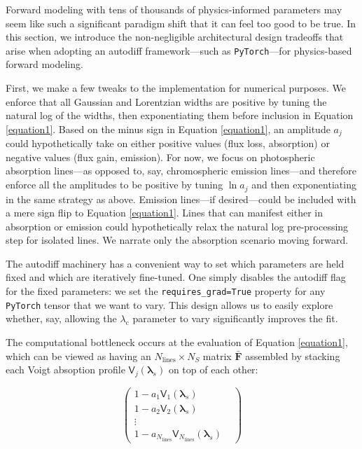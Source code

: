 \documentclass[twocolumn]{aastex631}
\begin{document}
Forward modeling with tens of thousands of physics-informed parameters may seem like such a significant paradigm shift that it can feel too good to be true.  In this section, we introduce the non-negligible architectural design tradeoffs that arise when adopting an autodiff framework---such as \texttt{PyTorch}---for physics-based forward modeling.

First, we make a few tweaks to the implementation for numerical purposes. We enforce that all Gaussian and Lorentzian widths are positive by tuning the natural log of the widths, then exponentiating them before inclusion in Equation \ref{equation1}. Based on the minus sign in Equation \ref{equation1}, an amplitude $a_j$ could hypothetically take on either positive values (flux loss, absorption) or negative values (flux gain, emission).  For now, we focus on photospheric absorption lines---as opposed to, say, chromospheric emission lines---and therefore enforce all the amplitudes to be positive by tuning $\ln{a_j}$ and then exponentiating in the same strategy as above.  Emission lines---if desired---could be included with a mere sign flip to Equation \ref{equation1}.  Lines that can manifest either in absorption or emission could hypothetically relax the natural log pre-processing step for isolated lines.  We narrate only the absorption scenario moving forward.

The autodiff machinery has a convenient way to set which parameters are held fixed and which are iteratively fine-tuned.  One simply disables the autodiff flag for the fixed parameters: we set the \texttt{requires\_grad=True} property for any \texttt{PyTorch} tensor that we want to vary. This design allows us to easily explore whether, say, allowing the $\lambda_\mathrm{c}$ parameter to vary significantly improves the fit.

The computational bottleneck occurs at the evaluation of Equation \ref{equation1}, which can be viewed as having an $N_{\mathrm{lines}}\times N_{S}$ matrix $\bm{\bar{F}}$ assembled by stacking each Voigt absoption profile $\mathsf{V}_j(\bm{\lambda}_s)$ on top of each other:

\begin{equation}
    \begin{pmatrix}
        1 - a_1 \mathsf{V}_1(\bm{\lambda}_s)                                       & \\
        1 - a_2 \mathsf{V}_2(\bm{\lambda}_s)                                       & \\
        \vdots                                                                     & \\
        1 - a_{N_{\mathrm{lines}}} \mathsf{V}_{N_{\mathrm{lines}}}(\bm{\lambda}_s) &
    \end{pmatrix}
\end{equation}
\end{document}
